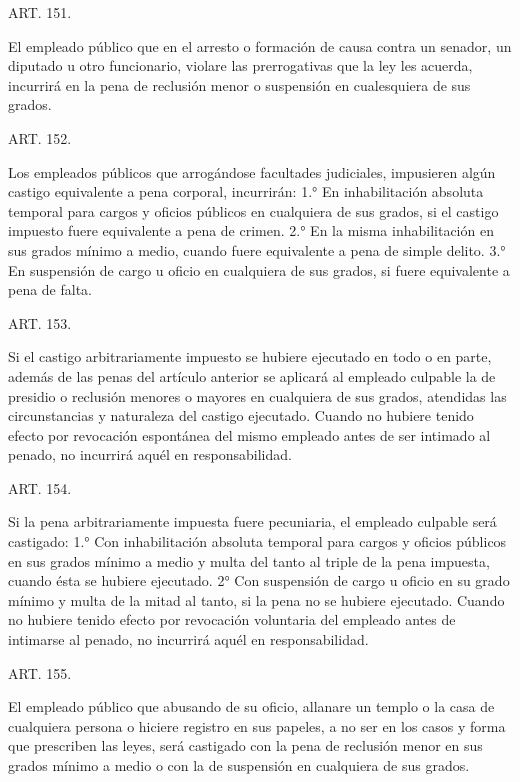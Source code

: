     ART. 151.

    El empleado público que en el arresto o formación de causa contra un senador, un diputado u otro funcionario, violare las prerrogativas que la ley les acuerda, incurrirá en la pena de reclusión menor o suspensión en cualesquiera de sus grados.


    ART. 152.

    Los empleados públicos que arrogándose facultades judiciales, impusieren algún castigo equivalente a pena corporal, incurrirán:
    1.° En inhabilitación absoluta temporal para cargos y oficios públicos en cualquiera de sus grados, si el castigo impuesto fuere equivalente a pena de crimen.
    2.° En la misma inhabilitación en sus grados mínimo a medio, cuando fuere equivalente a pena de simple delito.
    3.° En suspensión de cargo u oficio en cualquiera de sus grados, si fuere equivalente a pena de falta.



    ART. 153.

    Si el castigo arbitrariamente impuesto se hubiere ejecutado en todo o en parte, además de las penas del artículo anterior se aplicará al empleado culpable la de presidio o reclusión menores o mayores en cualquiera de sus grados, atendidas las circunstancias y naturaleza del castigo ejecutado.
    Cuando no hubiere tenido efecto por revocación espontánea del mismo empleado antes de ser intimado al penado, no incurrirá aquél en responsabilidad.


    ART. 154.

    Si la pena arbitrariamente impuesta fuere pecuniaria, el empleado culpable será castigado:
    1.° Con inhabilitación absoluta temporal para cargos y oficios públicos en sus grados mínimo a medio y multa del tanto al triple de la pena impuesta, cuando ésta se hubiere ejecutado.
    2° Con suspensión de cargo u oficio en su grado mínimo y multa de la mitad al tanto, si la pena no se hubiere ejecutado.   
    Cuando no hubiere tenido efecto por revocación voluntaria del empleado antes de intimarse al penado, no incurrirá aquél en responsabilidad.



    ART. 155.

    El empleado público que abusando de su oficio, allanare un templo o la casa de cualquiera persona o hiciere registro en sus papeles, a no ser en los casos y forma que prescriben las leyes, será castigado con la pena de reclusión menor en sus grados mínimo a medio o con la de suspensión en cualquiera de sus grados.


